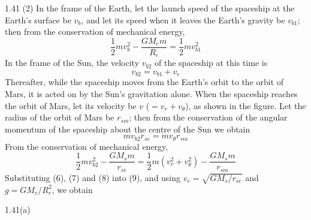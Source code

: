 \begin{solution}{1.41}
(2) In the frame of the Earth, let the launch speed of the spaceship at the Earth's surface be $v_b$, and let its speed when it leaves the Earth's gravity be $v_{b1}$; then from the conservation of mechanical energy,
\begin{equation}
\frac{1}{2}mv_b^2-\frac{GM_em}{R_e}=\frac{1}{2}mv_{b1}^2 \tag{6}
\end{equation}
In the frame of the Sun, the velocity $v_{b2}$ of the spaceship at this time is
\begin{equation}
v_{b2}=v_{b1}+v_e \tag{7}
\end{equation}
Thereafter, while the spaceship moves from the Earth's orbit to the orbit of Mars, it is acted on by the Sun's gravitation alone. When the spaceship reaches the orbit of Mars, let its velocity be $v$ ($=v_r+v_\theta$), as shown in the figure. Let the radius of the orbit of Mars be $r_{sm}$; then from the conservation of the angular momentum of the spaceship about the centre of the Sun we obtain
\begin{equation}
mv_{b2}r_{se}=mv_\theta r_{sm} \tag{8}
\end{equation}
From the conservation of mechanical energy,
\begin{equation}
\frac{1}{2}mv_{b2}^2-\frac{GM_sm}{r_{se}}=\frac{1}{2}m\left(v_r^2+v_\theta^2\right)-\frac{GM_sm}{r_{sm}} \tag{9}
\end{equation}
Substituting (6), (7) and (8) into (9), and using $v_e=\sqrt{GM_s/r_{se}}$ and $g=GM_e/R_e^2$, we obtain

\begin{figbox}{1.41(a)}
\end{figbox}


\end{solution}
